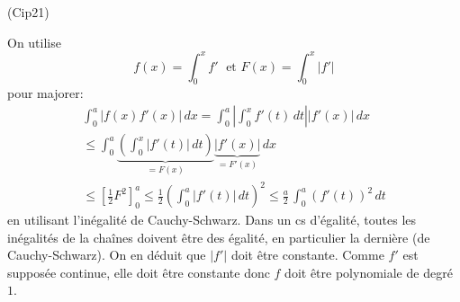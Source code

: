 \begin{tiny}(Cip21)\end{tiny} On utilise
\begin{displaymath}
 f(x)=\int_0^xf'\; \text{ et } F(x)= \int_0^x |f'|
\end{displaymath}
pour majorer:
\begin{multline*}
\int_0^a\left|f(x)f'(x)\right|\,dx
= \int_0^a\left|\int_0^xf'(t)\,dt\right|\left|f'(x)\right|\,dx\\
\leq \int_0^a \underset{=F(x)}{\underbrace{\left( \int_0^x\left|f'(t)\right|\,dt\right)}}  \underset{=F'(x)}{\underbrace{\left|f'(x)\right|}}\,dx \\
\leq \left[ \frac{1}{2}F^2\right]_0^a
\leq \frac{1}{2}\left( \int_0^a|f'(t)|\,dt\right)^2
\leq \frac{a}{2}\, \int_0^a(f'(t))^2\,dt
\end{multline*}
en utilisant l'inégalité de Cauchy-Schwarz.\newline
Dans un cs d'égalité, toutes les inégalités de la chaînes doivent être des égalité, en particulier la dernière (de Cauchy-Schwarz). On en déduit que $|f'|$ doit être constante. Comme $f'$ est supposée continue, elle doit être constante donc $f$ doit être polynomiale de degré $1$.